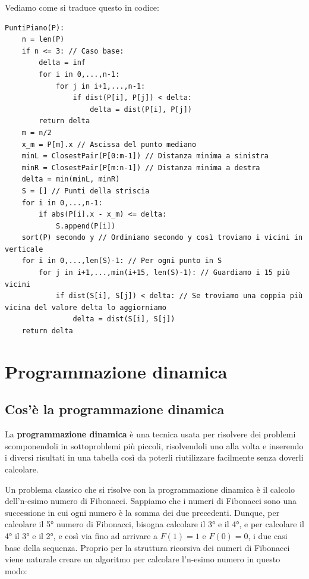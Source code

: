 \documentclass[11pt, a4paper, titlepage, oneside]{scrbook}
\begin{document}
Vediamo come si traduce questo in codice:
\begin{lstlisting}
PuntiPiano(P):
    n = len(P)
    if n <= 3: // Caso base:
        delta = inf
        for i in 0,...,n-1:
            for j in i+1,...,n-1:
                if dist(P[i], P[j]) < delta:
                    delta = dist(P[i], P[j])
        return delta
    m = n/2
    x_m = P[m].x // Ascissa del punto mediano
    minL = ClosestPair(P[0:m-1]) // Distanza minima a sinistra
    minR = ClosestPair(P[m:n-1]) // Distanza minima a destra
    delta = min(minL, minR)
    S = [] // Punti della striscia
    for i in 0,...,n-1:
        if abs(P[i].x - x_m) <= delta:
            S.append(P[i])
    sort(P) secondo y // Ordiniamo secondo y così troviamo i vicini in verticale
    for i in 0,...,len(S)-1: // Per ogni punto in S
        for j in i+1,...,min(i+15, len(S)-1): // Guardiamo i 15 più vicini
            if dist(S[i], S[j]) < delta: // Se troviamo una coppia più vicina del valore delta lo aggiorniamo
                delta = dist(S[i], S[j])
    return delta
\end{lstlisting}

\chapter{Programmazione dinamica}

\section{Cos'è la programmazione dinamica}

\begin{Definizione}
\label{def-progammazione-dinamica}
La \textbf{programmazione dinamica} è una tecnica usata per risolvere dei problemi scomponendoli in sottoproblemi più piccoli, risolvendoli uno alla volta e inserendo i diversi risultati in una tabella così da poterli riutilizzare facilmente senza doverli calcolare.
\end{Definizione}

Un problema classico che si risolve con la programmazione dinamica è il calcolo dell'n-esimo numero di Fibonacci. Sappiamo che i numeri di Fibonacci sono una successione in cui ogni numero è la somma dei due precedenti. Dunque, per calcolare il 5° numero di Fibonacci, bisogna calcolare il 3° e il 4°, e per calcolare il 4° il 3° e il 2°, e così via fino ad arrivare a $F(1) = 1$ e $F(0) = 0$, i due casi base della sequenza. Proprio per la struttura ricorsiva dei numeri di Fibonacci viene naturale creare un algoritmo per calcolare l'n-esimo numero in questo modo:
\end{document}
